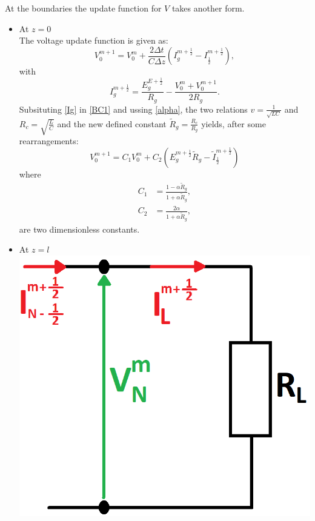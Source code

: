 \documentclass[dutch, a4paper, 11pt]{article}
\begin{document}
\begin{multicols}{2}
At the boundaries the update function for $V$ takes another form.
\begin{itemize}
    \item At $z = 0$\\
    The voltage update function is given as:
    \begin{equation}
        V^{m+1}_{0} = V^{m}_{0} + \frac{2\Delta t}{C\Delta z}\left(I^{m+\frac{1}{2}}_{g} - I^{m+\frac{1}{2}}_{\frac{1}{2}}\right),
        \label{BC1}
    \end{equation}
    with 
    \begin{equation}
        I^{m+\frac{1}{2}}_{g} = \frac{E^{E+\frac{1}{2}}_{g}}{R_{g}}-\frac{V^{m}_{0}+V^{m+1}_{0}}{2R_g}.
        \label{Ig}
    \end{equation}
    Subsituting \ref{Ig} in \ref{BC1} and ussing \ref{alpha}, the two relations $v=\frac{1}{\sqrt{LC}}$ and $R_c=\sqrt{\frac{L}{C}}$ and the new defined constant $\tilde{R}_{g} = \frac{R_c}{R_g}$ yields, 
    after some rearrangements:
    \begin{equation}
        V^{m+1}_{0} = C_{1}V^{m}_{0} + C_{2}\left(E^{m+\frac{1}{2}}_{g}\tilde{R}_{g} - \tilde{I}^{m+\frac{1}{2}}_{\frac{1}{2}}\right)
    \end{equation}
    where
    \begin{align}
        C_{1} & = \frac{1-\alpha\tilde{R}_{g}}{1+\alpha\tilde{R}_{g}},\\
        C_{2} & = \frac{2\alpha}{1+\alpha\tilde{R}_{g}},
    \end{align}
    are two dimensionless constants.
    \item At $z = l$\\
    \includegraphics[scale=0.25]{BC2}


\end{itemize}
\end{multicols}
\end{document}
